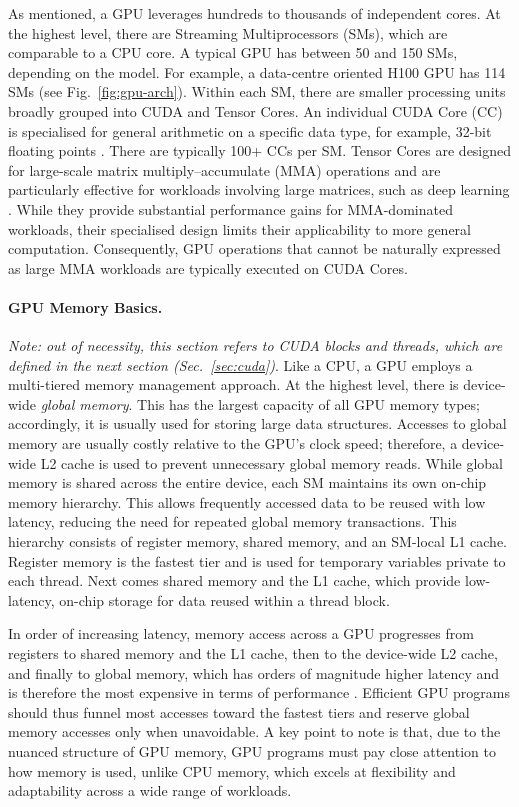 \documentclass{article}
\begin{document}
As mentioned, a GPU leverages hundreds to thousands of independent cores. At the highest level, there are Streaming Multiprocessors (SMs), which are comparable to a CPU core. A typical GPU has between 50 and 150 SMs, depending on the model. For example, a data-centre oriented H100 GPU has 114 SMs \cite{nvidia_hopper_architecture_2022} (see Fig.~\ref{fig:gpu-arch}). Within each SM, there are smaller processing units broadly grouped into CUDA and Tensor Cores. An individual CUDA Core (CC) is specialised for general arithmetic on a specific data type, for example, 32-bit floating points \cite{nvidia_ampere_ga102_2020}. There are typically 100+ CCs per SM. Tensor Cores are designed for large-scale matrix multiply–accumulate (MMA) operations and are particularly effective for workloads involving large matrices, such as deep learning \cite{nvidia_hopper_architecture_2022}. While they provide substantial performance gains for MMA-dominated workloads, their specialised design limits their applicability to more general computation. Consequently, GPU operations that cannot be naturally expressed as large MMA workloads are typically executed on CUDA Cores.

\paragraph{GPU Memory Basics.}

\textit{Note: out of necessity, this section refers to CUDA blocks and threads, which are defined in the next section (Sec.~\ref{sec:cuda})}. Like a CPU, a GPU employs a multi-tiered memory management approach. At the highest level, there is device-wide \textit{global memory}. This has the largest capacity of all GPU memory types; accordingly, it is usually used for storing large data structures. Accesses to global memory are usually costly relative to the GPU's clock speed; therefore, a device-wide L2 cache is used to prevent unnecessary global memory reads. While global memory is shared across the entire device, each SM maintains its own on-chip memory hierarchy. This allows frequently accessed data to be reused with low latency, reducing the need for repeated global memory transactions. This hierarchy consists of register memory, shared memory, and an SM-local L1 cache. Register memory is the fastest tier and is used for temporary variables private to each thread. Next comes shared memory and the L1 cache, which provide low-latency, on-chip storage for data reused within a thread block. 

In order of increasing latency, memory access across a GPU progresses from registers to shared memory and the L1 cache, then to the device-wide L2 cache, and finally to global memory, which has orders of magnitude higher latency and is therefore the most expensive in terms of performance \cite{harris_using_shared_memory_2013}. Efficient GPU programs should thus funnel most accesses toward the fastest tiers and reserve global memory accesses only when unavoidable.  A key point to note is that, due to the nuanced structure of GPU memory, GPU programs must pay close attention to how memory is used, unlike CPU memory, which excels at flexibility and adaptability across a wide range of workloads.
\end{document}
